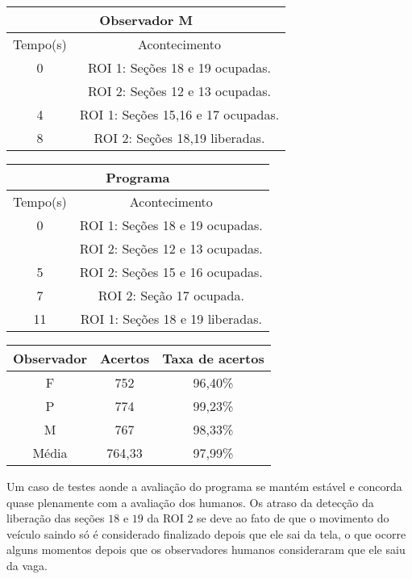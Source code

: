 \begin{center}
\begin{tabular}{|c||c|}
\hline
\multicolumn{2}{|c|}{Observador M}  \\ \hline \hline
Tempo(s) & Acontecimento \\ \hline
0 & ROI 1: Seções 18 e 19 ocupadas. \\
 & ROI 2: Seções 12 e 13 ocupadas. \\ \hline
4 & ROI 1: Seções 15,16 e 17 ocupadas. \\ \hline
8 & ROI 2: Seções 18,19 liberadas.\\
\hline
\end{tabular}
\end{center}

\begin{center}
\begin{tabular}{|c||c|}
\hline
\multicolumn{2}{|c|}{Programa}  \\ \hline \hline
Tempo(s) & Acontecimento \\ \hline
0 & ROI 1: Seções 18 e 19 ocupadas. \\
 & ROI 2: Seções 12 e 13 ocupadas. \\ \hline
5 & ROI 2: Seções 15 e 16 ocupadas. \\ \hline
7 & ROI 2: Seção 17 ocupada. \\ \hline
11 & ROI 1: Seções 18 e 19 liberadas. \\
\hline
\end{tabular}
\end{center}

\begin{center}
\begin{tabular}{|c||c||c|}
\hline
Observador & Acertos & Taxa de acertos \\ \hline
F & 752 & 96,40\% \\  \hline
P & 774 & 99,23\% \\ \hline
M & 767 & 98,33\% \\ \hline
Média & 764,33 & 97,99\% \\
\hline
\end{tabular}
\end{center}

Um caso de testes aonde a avaliação do programa se mantém estável e concorda quase plenamente com a avaliação dos humanos. Os atraso da detecção da liberação das seções $18$ e $19$ da ROI $2$ se deve ao fato de que o movimento do veículo saindo só é considerado finalizado depois que ele sai da tela, o que ocorre alguns momentos depois que os observadores humanos consideraram que ele saiu da vaga.

